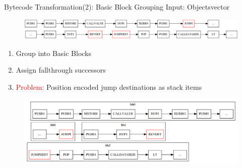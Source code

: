 \documentclass[11pt]{beamer}
\begin{document}
\begin{frame}{Bytecode Transformation(2): Basic Block Grouping}
Input: Objectsvector
\begin{figure}
    \centering
    \includegraphics[scale=0.24]{figures/norm2_input.png}
\end{figure}
\begin{enumerate}
    \item Group into Basic Blocks
    \item Assign fallthrough successors
    \item \textcolor{red}{Problem:} Position encoded jump destinations as stack items
\end{enumerate}
\begin{figure}
    \centering
    \includegraphics[scale=0.25]{figures/norm2_step.png}
\end{figure}
\end{frame}
\end{document}
